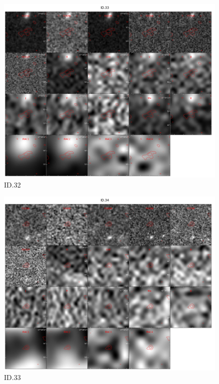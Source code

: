 \begin{figure}[tbp]
\centering \includegraphics[width=120mm]{Matched/ASPECS_Cutout_32.jpg}
\caption{ID.32}
\label{fig:Match_Three}
\end{figure}

\begin{figure}[tbp]
\centering \includegraphics[width=120mm]{Matched/ASPECS_Cutout_33.jpg}
\caption{ID.33}
\label{fig:Match_Three}
\end{figure}

